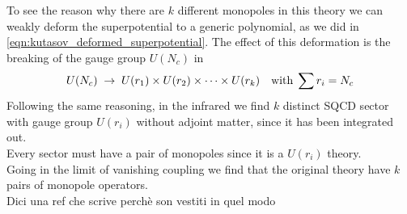 To see the reason why there are $k$ different monopoles in this theory we can weakly deform the superpotential to a generic polynomial, as we did in \eqref{eqn:kutasov_deformed_superpotential}.
The effect of this deformation is the breaking of the gauge group $U(N_c)$ in 
\begin{equation}
U(N_c) \; \rightarrow \; U(r_1) \times U(r_2) \times \dots \times U(r_k) \quad \hbox{with} \; \sum r_i = N_c
\end{equation}
Following the same reasoning, in the infrared we find $k$ distinct SQCD sector with gauge group $U(r_i)$ without adjoint matter, since it has been integrated out.\\
Every sector must have a pair of monopoles since it is a $U(r_i)$ theory.\\
Going in the limit of vanishing coupling we find that the original theory have $k$ pairs of monopole operators.\\
{\Large Dici una ref che scrive perchè son vestiti in quel modo }

